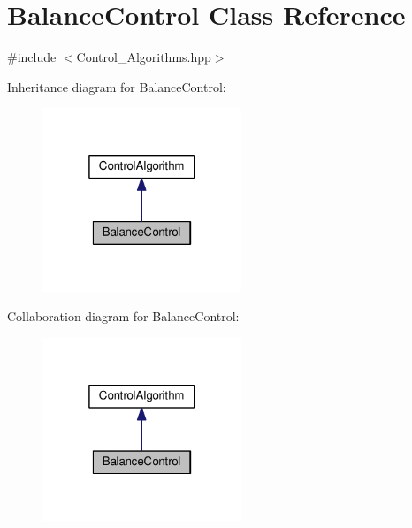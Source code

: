 \hypertarget{classBalanceControl}{}\section{Balance\+Control Class Reference}
\label{classBalanceControl}


{\ttfamily \#include $<$Control\+\_\+\+Algorithms.\+hpp$>$}



Inheritance diagram for Balance\+Control\+:\nopagebreak
\begin{figure}[H]
\begin{center}
\leavevmode
\includegraphics[width=169pt]{classBalanceControl__inherit__graph}
\end{center}
\end{figure}


Collaboration diagram for Balance\+Control\+:
\nopagebreak
\begin{figure}[H]
\begin{center}
\leavevmode
\includegraphics[width=169pt]{classBalanceControl__coll__graph}
\end{center}
\end{figure}
